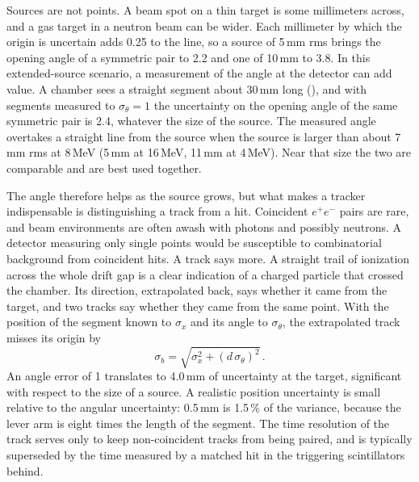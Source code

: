 Sources are not points. A beam spot on a thin target is some millimeters across, and a gas target in a neutron beam can be wider. Each millimeter by which the origin is uncertain adds 0.25\textdegree{} to the line, so a source of 5\,mm
rms brings the opening angle of a symmetric pair to 2.2\textdegree{} and one of 10\,mm to 3.8\textdegree. In this extended-source scenario, a measurement of the angle at the detector can add value. A chamber sees a straight segment about
30\,mm long (), and with segments measured to $\sigma_{\theta}=1$\textdegree{} the uncertainty on the opening angle of the same symmetric pair is 2.4\textdegree{}, whatever the size of the source. The measured angle overtakes a straight line from the source when the source is larger than about 7\,mm rms at 8\,MeV (5\,mm at 16\,MeV, 11\,mm at 4\,MeV). Near that size the two are comparable and are best used together.

The angle therefore helps as the source grows, but what makes
a tracker indispensable is distinguishing a track from a hit. Coincident $e^+e^-$ pairs are rare, and beam environments are often awash with photons and possibly neutrons. A detector measuring only single points would be susceptible to combinatorial background from coincident hits. A track says more. A straight trail of ionization across the whole drift gap is a clear indication of a charged particle that crossed the chamber. Its direction, extrapolated back, says whether it
came from the target, and two tracks say whether they came from the same point. With the position of the segment known to $\sigma_x$ and its angle to $\sigma_\theta$, the extrapolated track misses its origin by
\begin{equation}
  \sigma_b=\sqrt{\sigma_x^2+(d\,\sigma_\theta)^2}\,.\label{eq:pointing}
\end{equation}
An angle error of 1\textdegree{} translates to 4.0\,mm of uncertainty at the target, significant with respect to the size of a source. A realistic position uncertainty is small relative to the angular uncertainty: 0.5\,mm is 1.5\,\% of the variance, because the lever arm is eight times the length of the segment. The time resolution of the track serves only to keep non-coincident tracks from being paired, and is typically superseded by the time measured by a matched hit in the triggering scintillators behind.

